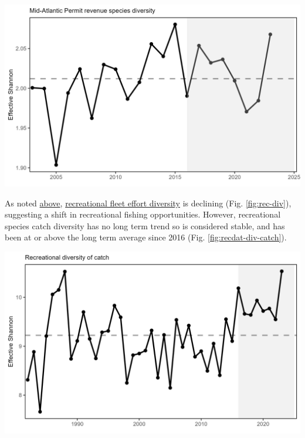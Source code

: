 \documentclass[
  10pt,
]{article}
\let\origfigure\figure
\let\endorigfigure\endfigure
\renewenvironment{figure}[1][2] {
    \expandafter\origfigure\expandafter[H]
} {
    \endorigfigure
}
\begin{document}
\begin{figure}

{\centering \includegraphics[width=6.5in]{images/MidAtlantic/commercial_div_species_div_MidAtlantic_2025-09-05} 

}

\caption{Species revenue diversity in the Mid Atlantic.}\label{fig:commercial-div-species-div}
\end{figure}

As noted \hyperref[recreational-opportunities]{above}, \href{https://noaa-edab.github.io/catalog/recdat.html}{recreational fleet effort diversity} is declining (Fig. \ref{fig:rec-div}), suggesting a shift in recreational fishing opportunities. However, recreational species catch diversity has no long term trend so is considered stable, and has been at or above the long term average since 2016 (Fig. \ref{fig:recdat-div-catch}).

\begin{figure}

{\centering \includegraphics[width=6.5in]{images/MidAtlantic/recdat_div_catch_MidAtlantic_2025-09-05} 

}

\caption{Diversity of recreational catch in the Mid Atlantic.}\label{fig:recdat-div-catch}
\end{figure}
\end{document}
